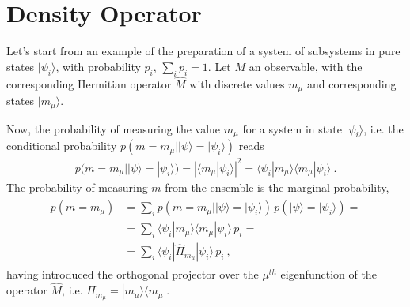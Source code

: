 \documentclass[letterpaper,10pt,english]{jupyterBook}
\begin{document}
\sphinxstepscope


\chapter{Density Operator}
\label{\detokenize{ch/quantum-mechanics/density-operator:density-operator}}\label{\detokenize{ch/quantum-mechanics/density-operator:quantum-mechanics-density-operator}}\label{\detokenize{ch/quantum-mechanics/density-operator::doc}}
\sphinxAtStartPar
Let’s start from an example of the preparation of a system of subsystems in pure states \(| \psi_i \rangle\), with probability \(p_i\), \(\sum_i p_i = 1\). Let \(M\) an observable, with the corresponding Hermitian operator \(\hat{M}\) with discrete values \(m_\mu\) and corresponding states \(| m_{\mu} \rangle\).

\sphinxAtStartPar
Now, the probability of measuring the value \(m_{\mu}\) for a system in state \(| \psi_i \rangle\), i.e. the conditional probability \(p(m=m_{\mu} | | \psi \rangle = | \psi_i \rangle)\) reads
\begin{equation*}
\begin{split}p(m=m_{\mu} |  | \psi \rangle = | \psi_i \rangle ) = | \langle m_{\mu} | \psi_i \rangle |^2 =  \langle  \psi_i | m_{\mu} \rangle  \langle m_{\mu} | \psi_i \rangle \ .\end{split}
\end{equation*}
\sphinxAtStartPar
The probability of measuring \(m\) from the ensemble is the marginal probability,
\begin{equation*}
\begin{split}\begin{aligned}
  p(m = m_{\mu}) 
  & = \sum_i p(m = m_{\mu} | | \psi \rangle = | \psi_i \rangle) \, p( | \psi \rangle = | \psi_i \rangle ) = \\
  & = \sum_i \langle \psi_i | m_{\mu} \rangle \langle m_{\mu} | \psi_i \rangle \, p_i = \\
  & = \sum_i \langle \psi_i | \hat{\Pi}_{m_{\mu}} | \psi_i \rangle \, p_i \ ,
\end{aligned}\end{split}
\end{equation*}
\sphinxAtStartPar
having introduced the orthogonal projector over the \(\mu^{th}\) eigenfunction of the operator \(\hat{M}\), i.e. \(\hat{\Pi}_{m_{\mu}} = | m_{\mu} \rangle \langle m_{\mu} |\).
\end{document}
